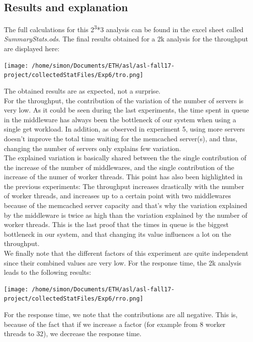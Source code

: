 \documentclass[11pt,a4paper]{article}
\begin{document}
\subsection{Results and explanation}
The full calculations for this 2\textsuperscript{3}*3 analysis can be found in the excel sheet called \textit{SummaryStats.ods}. The final results obtained for a 2k analysis for the throughput are displayed here:
\begin{center} 
\texttt{[image: /home/simon/Documents/ETH/asl/asl-fall17-project/collectedStatFiles/Exp6/tro.png]}
\end{center}
The obtained results are as expected, not a surprise. 
\\
For the throughput, the contribution of the variation of the number of servers is very low. As it could be seen during the last experiments, the time spent in queue in the middleware has always been the bottleneck of our system when using a single get workload. In addition, as observed in experiment 5, using more servers doesn't improve the total time waiting for the memcached server(s), and thus, changing the number of servers only explains few variation. 
\\
The explained variation is basically shared between the the single contribution of the increase of the number of middlewares, and the single contribution of the increase of the numer of worker threads. This point has also been highlighted in the previous experiments: The throughput increases drastically with the number of worker threads, and increases up to a certain point with two middlewares because of the memcached server capacity and that's why the variation explained by the middleware is twice as high than the variation explained by the number of worker threads. This is the last proof that the times in queue is the biggest bottleneck in our system, and that changing its value influences a lot on the throughput. 
\\We finally note that the different factors of this experiment are quite independent since their combined values are very low. 
\newpage
For the response time, the 2k analysis leads to the following results:
\\
\begin{center} 
\texttt{[image: /home/simon/Documents/ETH/asl/asl-fall17-project/collectedStatFiles/Exp6/rro.png]}
\end{center} 
For the response time, we note that the contributions are all negative. This is, because of the fact that if we increase a factor (for example from 8 worker threads to 32), we decrease the response time. 
\end{document}
